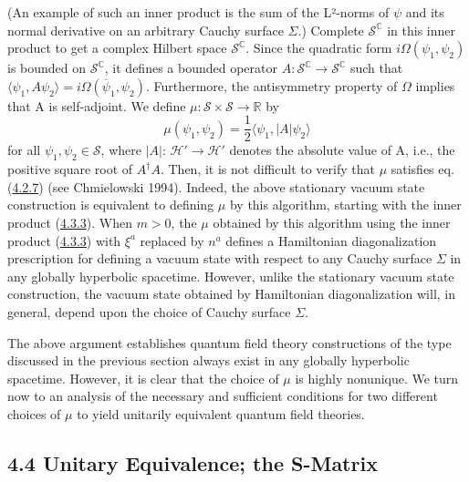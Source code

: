 \documentclass[11pt,a4paper]{article}
\begin{document}
(An example of such an inner product is the sum of the L²-norms of \(\psi\) and its normal derivative on an arbitrary Cauchy surface \(\Sigma\).) Complete \(\mathcal{S}^{ \mathbb{C}}\) in this inner product to get a complex Hilbert space \(\mathcal{S}^{ \mathbb{C}}\). Since the quadratic form \(i\Omega(\psi_1,\psi_2)\) is bounded on \(\mathcal{S}^{ \mathbb{C}}\), it defines a bounded operator \(A\colon \mathcal{S}^{ \mathbb{C}} \to \mathcal{S}^{ \mathbb{C}}\) such that \(\langle \psi_1,A \psi_2\rangle =i\Omega (\overline{\psi}_1,\psi_2).\) Furthermore, the antisymmetry property of \(\Omega\) implies that A is self-adjoint. We define \(\mu\colon \mathcal{S}\times\mathcal{S}\to\mathbb{R}\) by
\begin{equation*}
\mu(\psi_1,\psi_2)=\frac12\langle\psi_1,\lvert A\rvert\psi_2\rangle \tag{4.3.11}\label{eq:4.3.11}
\end{equation*}
for all \(\psi_1, \psi_2 \in \mathcal{S}\), where \(\lvert A\rvert\): \(\mathcal{H}' \to \mathcal{H}'\) denotes the absolute value of A, i.e., the positive square root of \(A^\dagger A\). Then, it is not difficult to verify that \(\mu\) satisfies eq. (\hyperref[eq:4.2.7]{4.2.7}) (see Chmielowski 1994). Indeed, the above stationary vacuum state construction is equivalent to defining \(\mu\) by this algorithm, starting with the inner product (\hyperref[eq:4.3.3]{4.3.3}). When \(m>0\), the \(\mu\) obtained by this algorithm using the inner product (\hyperref[eq:4.3.3]{4.3.3}) with \(\xi^a\) replaced by \(n^a\) defines a Hamiltonian diagonalization prescription for defining a vacuum state with respect to any Cauchy surface \(\Sigma\) in any globally hyperbolic spacetime. However, unlike the stationary vacuum state construction, the vacuum state obtained by Hamiltonian diagonalization will, in general, depend upon the choice of Cauchy surface \(\Sigma\).

The above argument establishes quantum field theory constructions of the type discussed in the previous section always exist in any globally hyperbolic spacetime. However, it is clear that the choice of \(\mu\) is highly nonunique. We turn now to an analysis of the necessary and sufficient conditions for two different choices of \(\mu\) to yield unitarily equivalent quantum field theories.

\hypertarget{source-79}{}
\subsection*{4.4 Unitary Equivalence; the S-Matrix}\hypertarget{sec:4.4}{}
\end{document}
